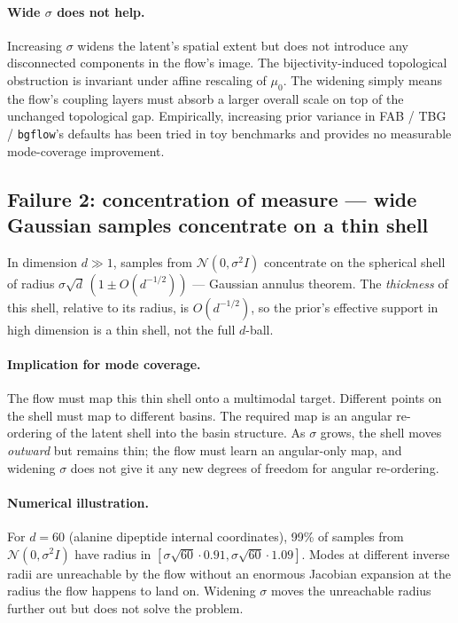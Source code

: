 \documentclass[11pt,letterpaper]{article}
\theoremstyle{plain}
\begin{document}
\paragraph{Wide $\sigma$ does not help.} Increasing $\sigma$ widens the
latent's spatial extent but does not introduce any disconnected components in
the flow's image. The bijectivity-induced topological obstruction is invariant
under affine rescaling of $\mu_0$. The widening simply means the flow's
coupling layers must absorb a larger overall scale on top of the unchanged
topological gap. Empirically, increasing prior variance in FAB / TBG /
\texttt{bgflow}'s defaults has been tried in toy benchmarks and provides no
measurable mode-coverage improvement.

\subsection{Failure 2: concentration of measure --- wide Gaussian samples concentrate on a thin shell}

In dimension $d \gg 1$, samples from $\mathcal N(0,\sigma^2 I)$ concentrate on
the spherical shell of radius $\sigma\sqrt{d}\,(1\pm O(d^{-1/2}))$ ---
Gaussian annulus theorem. The \emph{thickness} of this shell, relative to its
radius, is $O(d^{-1/2})$, so the prior's effective support in high dimension
is a thin shell, not the full $d$-ball.

\paragraph{Implication for mode coverage.} The flow must map this thin shell
onto a multimodal target. Different points on the shell must map to different
basins. The required map is an angular re-ordering of the latent shell into
the basin structure. As $\sigma$ grows, the shell moves \emph{outward} but
remains thin; the flow must learn an angular-only map, and widening $\sigma$
does not give it any new degrees of freedom for angular re-ordering.

\paragraph{Numerical illustration.} For $d = 60$ (alanine dipeptide internal
coordinates), 99\% of samples from $\mathcal N(0, \sigma^2 I)$ have radius in
$[\sigma\sqrt{60}\cdot 0.91, \sigma\sqrt{60}\cdot 1.09]$. Modes at different
inverse radii are unreachable by the flow without an enormous Jacobian
expansion at the radius the flow happens to land on. Widening $\sigma$ moves
the unreachable radius further out but does not solve the problem.
\end{document}
